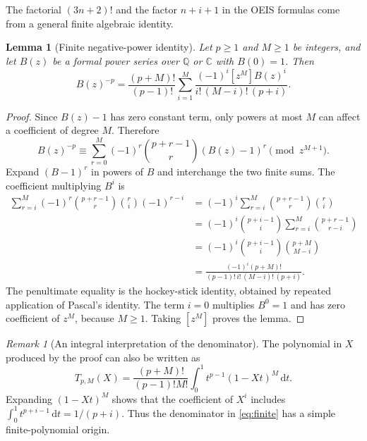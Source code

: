 \documentclass[11pt,letterpaper]{article}
\numberwithin{equation}{section}
\newtheorem{lemma}[theorem]{Lemma}
\theoremstyle{remark}
\newtheorem{remark}[theorem]{Remark}
\newcommand{\dd}{\,\mathrm{d}}
\begin{document}
The factorial $(3n+2)!$ and the factor $n+i+1$ in the OEIS formulas come
from a general finite algebraic identity.

\begin{lemma}[Finite negative-power identity]
\label{lem:finite}
Let $p\geq1$ and $M\geq1$ be integers, and let $B(z)$ be a formal power
series over $\mathbb Q$ or $\mathbb C$ with $B(0)=1$. Then
\begin{equation}
 [z^M]B(z)^{-p}
 =\frac{(p+M)!}{(p-1)!}
   \sum_{i=1}^{M}
   \frac{(-1)^i[z^M]B(z)^i}{i!\,(M-i)!\,(p+i)}.
 \label{eq:finite}
\end{equation}
\end{lemma}

\begin{proof}
Since $B(z)-1$ has zero constant term, only powers at most $M$ can affect
a coefficient of degree $M$. Therefore
\begin{equation}
 B(z)^{-p}\equiv
 \sum_{r=0}^{M}(-1)^r\binom{p+r-1}{r}(B(z)-1)^r
 \pmod{z^{M+1}}.
 \label{eq:truncated}
\end{equation}
Expand $(B-1)^r$ in powers of $B$ and interchange the two finite sums.
The coefficient multiplying $B^i$ is
\begin{align*}
 \sum_{r=i}^{M}(-1)^r\binom{p+r-1}{r}
                     \binom ri(-1)^{r-i}
 &=(-1)^i\sum_{r=i}^{M}\binom{p+r-1}{r}\binom ri\\
 &=(-1)^i\binom{p+i-1}{i}
                \sum_{r=i}^{M}\binom{p+r-1}{r-i}\\
 &=(-1)^i\binom{p+i-1}{i}\binom{p+M}{M-i}\\
 &=\frac{(-1)^i(p+M)!}
        {(p-1)!\,i!\,(M-i)!\,(p+i)}.
\end{align*}
The penultimate equality is the hockey-stick identity, obtained by repeated
application of Pascal's identity. The term $i=0$ multiplies $B^0=1$ and has
zero coefficient of $z^M$, because $M\geq1$. Taking $[z^M]$ proves the lemma.
\end{proof}

\begin{remark}[An integral interpretation of the denominator]
The polynomial in $X$ produced by the proof can also be written as
\begin{equation}
 T_{p,M}(X)=\frac{(p+M)!}{(p-1)!M!}
        \int_0^1 t^{p-1}(1-Xt)^M\dd t.
 \label{eq:beta}
\end{equation}
Expanding $(1-Xt)^M$ shows that the coefficient of $X^i$ includes
$\int_0^1t^{p+i-1}\dd t=1/(p+i)$. Thus the denominator in
\eqref{eq:finite} has a simple finite-polynomial origin.
\end{remark}
\end{document}

